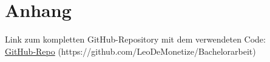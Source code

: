 \section*{Anhang}
Link zum kompletten GitHub-Repository mit dem verwendeten Code:\\ \href{https://github.com/LeoDeMonetize/Bachelorarbeit}{GitHub-Repo} (https://github.com/LeoDeMonetize/Bachelorarbeit)